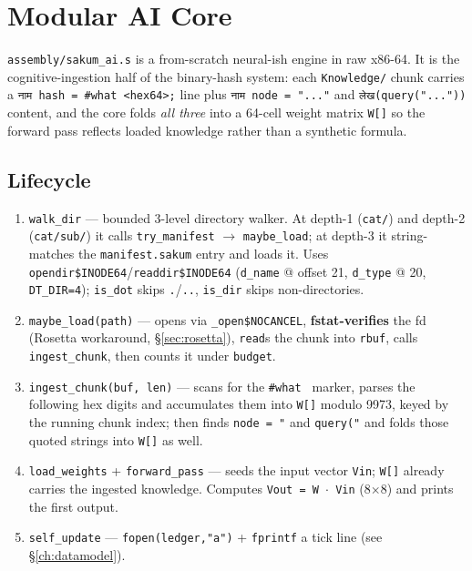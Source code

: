 \section{Modular AI Core}\label{ch:ai}

\texttt{assembly/sakum\_ai.s} is a from-scratch neural-ish engine in raw
x86-64.  It is the cognitive-ingestion half of the binary-hash system: each
\texttt{Knowledge/} chunk carries a \texttt{नाम hash = \#what <hex64>;}
line plus \texttt{नाम node = "..."} and \texttt{लेख(query("..."))} content,
and the core folds \emph{all three} into a 64-cell weight matrix
\texttt{W[]} so the forward pass reflects loaded knowledge rather than a
synthetic formula.

\subsection{Lifecycle}

\begin{enumerate}
  \item \texttt{walk\_dir} --- bounded 3-level directory walker.  At depth-1
    (\texttt{cat/}) and depth-2 (\texttt{cat/sub/}) it calls
    \texttt{try\_manifest} $\to$ \texttt{maybe\_load}; at depth-3 it
    string-matches the \texttt{manifest.sakum} entry and loads it.  Uses
    \texttt{opendir\$INODE64}/\texttt{readdir\$INODE64} (\texttt{d\_name} @
    offset 21, \texttt{d\_type} @ 20, \texttt{DT\_DIR=4}); \texttt{is\_dot}
    skips \texttt{.}/\texttt{..}, \texttt{is\_dir} skips non-directories.
  \item \texttt{maybe\_load(path)} --- opens via \texttt{\_open\$NOCANCEL},
    \textbf{fstat-verifies} the fd (Rosetta workaround, \S\ref{sec:rosetta}),
    \texttt{read}s the chunk into \texttt{rbuf}, calls \texttt{ingest\_chunk},
    then counts it under \texttt{budget}.
  \item \texttt{ingest\_chunk(buf, len)} --- scans for the \texttt{\#what }
    marker, parses the following hex digits and accumulates them into
    \texttt{W[]} modulo 9973, keyed by the running chunk index; then finds
    \texttt{node = "} and \texttt{query("} and folds those quoted strings
    into \texttt{W[]} as well.
  \item \texttt{load\_weights} + \texttt{forward\_pass} --- seeds the input
    vector \texttt{Vin}; \texttt{W[]} already carries the ingested
    knowledge.  Computes \texttt{Vout = W $\cdot$ Vin} (8$\times$8) and
    prints the first output.
  \item \texttt{self\_update} --- \texttt{fopen(ledger,"a")} + \texttt{fprintf}
    a tick line (see \S\ref{ch:datamodel}).
\end{enumerate}

